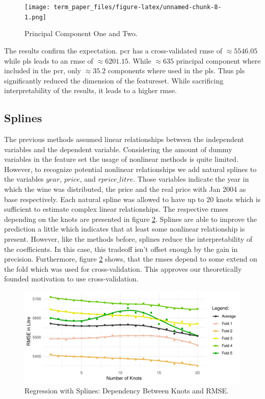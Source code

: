 \documentclass[11pt,]{article}
\begin{document}
\begin{figure}
\centering
\texttt{[image: term\_paper\_files/figure-latex/unnamed-chunk-8-1.png]}
\caption{\label{fig:PrincCom}Principal Component One and Two.}
\end{figure}

The results confirm the expectation. \ac{pcr} has a cross-validated
\ac{rmse} of \(\approx 5546.05\) while \ac{pls} leads to an \ac{rmse} of
\(\approx 6201.15\). While \(\approx 635\) principal component where
included in the \ac{pcr}, only \(\approx 35.2\) components where used in
the \ac{pls}. Thus \ac{pls} significantly reduced the dimension of the
featureset. While sacrificing interpretability of the results, it leads
to a higher \ac{rmse}.

\hypertarget{splines}{%
\subsection{Splines}\label{splines}}

The previous methods assumed linear relationships between the
independent variables and the dependent variable. Considering the amount
of dummy variables in the feature set the usage of nonlinear methods is
quite limited. However, to recognize potential nonlinear relationships
we add natural splines to the variables \(year\), \(price\), and
\(rprice\_litre\). Those variables indicate the year in which the wine
was distributed, the price and the real price with Jan 2004 as base
respectively. Each natural spline was allowed to have up to 20 knots
which is sufficient to estimate complex linear relationships. The
respective \ac{rmse}s depending on the knots are presented in figure
\ref{fig:splines}. Splines are able to improve the prediction a little
which indicates that at least some nonlinear relationship is present.
However, like the methods before, splines reduce the interpretability of
the coefficients. In this case, this tradeoff isn't offset enough by the
gain in precision. Furthermore, figure \ref{fig:splines} shows, that the
\ac{rmse}s depend to some extend on the fold which was used for
cross-validation. This approves our theoretically founded motivation to
use cross-validation.

\begin{figure}

\includegraphics{../00_data/output_paper/08_splines} \hfill{}

\caption[RMSE Values of Different Spline Models]{\label{fig:splines}Regression with Splines: Dependency Between Knots and RMSE.}\label{fig:splines}
\end{figure}
\end{document}
